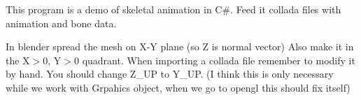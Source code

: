 This program is a demo of skeletal animation in C\#. Feed it collada files with animation and bone data.

In blender spread the mesh on X-\/Y plane (so Z is normal vector) Also make it in the X$>$0, Y$>$0 quadrant. When importing a collada file remember to modify it by hand. You should change Z\+\_\+\+UP to Y\+\_\+\+UP. (I think this is only necessary while we work with Grpahics object, when we go to opengl this should fix itself) 